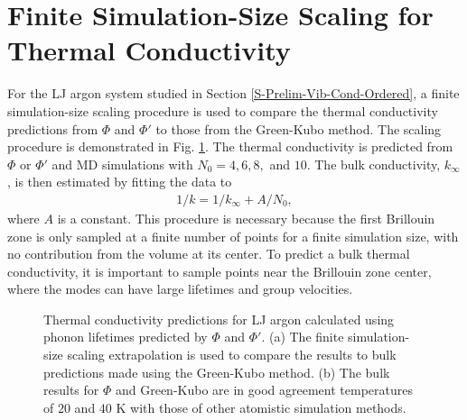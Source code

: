 \documentclass[aps,prb,preprint,superscriptaddress,amsmath,amssymb,floatfix]{revtex4}
\begin{document}
\section{\label{A-Finite-Sim}Finite Simulation-Size Scaling for Thermal 
Conductivity}
For the LJ argon system studied in Section \ref{S-Prelim-Vib-Cond-Ordered}, 
a finite simulation-size scaling procedure\cite{turney2009a,He2011a} is 
used to compare the thermal conductivity predictions from $\Phi$ and $\Phi'$ 
to those from the Green-Kubo method. The scaling procedure is demonstrated in 
Fig$.$ \ref{FIG:LJ_COND}. The thermal conductivity is predicted from $\Phi$ 
or $\Phi'$ and MD simulations with $N_0 = 4,6,8,$ and $10$. The bulk 
conductivity, $k_{\infty}$, is then estimated by fitting the data to
\begin{equation}\label{k_size}
\begin{split}
1/k = 1/k_{\infty} + A/N_0,
\end{split}
\end{equation}
where $A$ is a constant. This procedure is necessary because the first 
Brillouin zone is only sampled at a finite number of points for a finite 
simulation size, with no contribution from the volume at its center. To 
predict a bulk thermal conductivity, it is important to sample points near 
the Brillouin zone center, where the modes can have large lifetimes and 
group velocities.\cite{turney2009a,sellan2010b} 
\begin{figure}
\begin{center}
\end{center}
\caption{\label{FIG:LJ_COND} Thermal conductivity predictions for LJ argon calculated using phonon lifetimes predicted by $\Phi$ and $\Phi'$.\cite{Larkin2012} (a) The finite simulation-size scaling extrapolation \cite{turney2009a,He2011a} is used to compare the results to bulk predictions made using the Green-Kubo method. (b) The bulk results for $\Phi$ and Green-Kubo are in good agreement temperatures of $20$ and $40$ K with those of other atomistic simulation methods.\cite{turney2009a}}
\end{figure}


\clearpage


\end{document}

